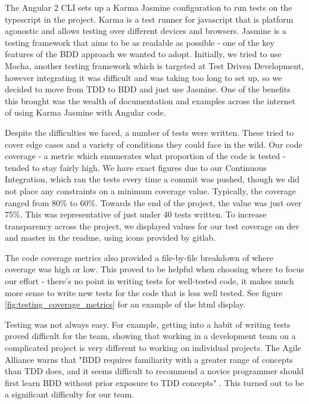 \documentclass{l3proj}
\begin{document}
 

The Angular 2 CLI sets up a Karma Jasmine configuration to run tests on
 the typescript in the project. Karma is a test runner for javascript
 that is platform agonostic and allows testing over different devices
 and browsers. Jasmine is a testing framework that aims to be as readable
 as possible - one of the key features of the BDD approach we wanted to
 adopt. Initially, we tried to use Mocha, another testing framework which
 is targeted at Test Driven Development, however integrating it was difficult
 and was taking too long to set up, so we decided to move from TDD to BDD and
 just use Jasmine. One of the benefits this brought was the wealth of
 documentation and examples across the internet of using Karma Jasmine
 with Angular code.

Despite the difficulties we faced, a number of tests were written. These
 tried to cover edge cases and a variety of conditions they could face in
 the wild. Our code coverage - a metric which enumerates what proportion of
 the code is tested - tended to stay fairly high. We have exact figures due
 to our Continuous Integration, which ran the tests every time a commit was
 pushed, though we did not place any constraints on a minimum coverage value.
 Typically, the coverage ranged from 80\% to 60\%. Towards the end of the
 project, the value was just over 75\%. This was representative of just under 40
 tests written. To increase transparency across the project, we displayed values
 for our test coverage on dev and master in the readme, using icons provided by gitlab.

 The code coverage metrics also provided a file-by-file breakdown of where
 coverage was high or low. This proved to be helpful when choosing
 where to focus our effort - there's no point in writing tests for
 well-tested code, it makes much more sense to write new tests for the
 code that is less well tested. See figure \ref{fig:testing_coverage_metrics}
 for an example of the html display.

Testing was not always easy. For example, getting into a habit of writing tests
 proved difficult for the team, showing that working in a development team on a
 complicated project is very different to working on individual projects. The
 Agile Alliance warns that "BDD requires familiarity with a greater range of
 concepts than TDD does, and it seems difficult to recommend a novice programmer
 should first learn BDD without prior exposure to TDD concepts"
 \cite{agilealliance_bdd}. This turned out to be a significant difficulty for
 our team.
\end{document}
